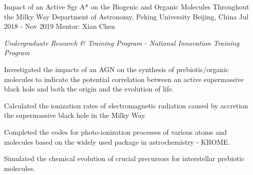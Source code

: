 


\begin{cvexperiences}


\cvexperience
{Impact of an Active Sgr A* on the Biogenic and Organic Molecules Throughout the Milky Way} %
{Department of Astronomy, Peking University} %
{Beijing, China} %
{Jul 2018 - Nov 2019} %
{Mentor: Xian Chen}
{ %
\begin{cvitems}
\item {\textit{Undergraduate Research \& Training Program - National Innovation Training Program}}
\item {Investigated the impacts of an AGN on the synthesis of prebiotic/organic molecules to indicate the potential correlation between an active supermassive black hole and both the origin and the evolution of life.}
\item {Calculated the ionization rates of electromagnetic radiation caused by accretion the supermassive black hole in the Milky Way.}
\item {Completed the codes for photo-ionization processes of various atoms and molecules based on the widely used package in astrochemistry - KROME.}
\item {Simulated the chemical evolution of crucial precursors for interstellar prebiotic molecules.}
\end{cvitems}
}


\end{cvexperiences}
